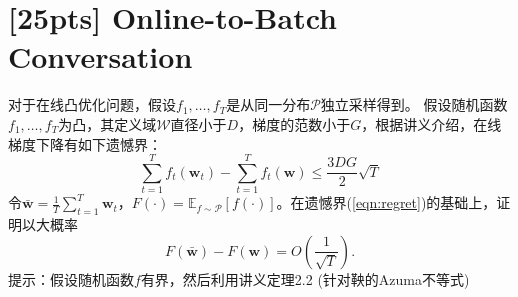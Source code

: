 \documentclass[a4paper,UTF8]{article}
\numberwithin{equation}{section}
\begin{document}
\section{[25pts] Online-to-Batch Conversation}
\noindent 对于在线凸优化问题，假设$f_1,\ldots,f_T$是从同一分布$\mathcal{P}$独立采样得到。
假设随机函数$f_1,\ldots,f_T$为凸，其定义域$\mathcal{W}$直径小于$D$，梯度的范数小于$G$，根据讲义介绍，在线梯度下降有如下遗憾界：
\begin{equation} \label{eqn:regret}
\sum_{t=1}^T f_t(\mathbf{w}_{t}) -  \sum_{t=1}^T f_t(\mathbf{w}) \leq \frac{3 DG}{2} \sqrt{T}
\end{equation}
令$\bar{\mathbf{w}}=\frac{1}{T} \sum_{t=1}^T \mathbf{w}_t$，$F(\cdot)=\mathbb{E}_{f \sim \mathcal{P}}[f(\cdot)]$。在遗憾界(\ref{eqn:regret})的基础上，证明以大概率
\[
F(\bar{\mathbf{w}}) -  F(\mathbf{w}) = O\left( \frac{1}{\sqrt{T}}\right).
\]
提示：假设随机函数$f$有界，然后利用讲义定理2.2 (针对鞅的Azuma不等式)
\end{document}
